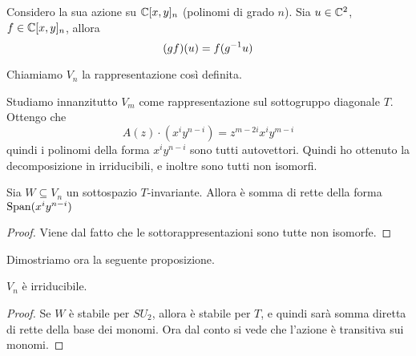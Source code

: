 	Considero la sua azione su $\mathbb C[x,y]_n$ (polinomi di grado $n$). Sia $u \in \mathbb C^2$, $f \in \mathbb C[x,y]_n$, allora 
	\[
	 (gf)(u) = f(g^{-1} u)
	\]
	
	Chiamiamo $V_n$ la rappresentazione così definita.

	Studiamo innanzitutto $V_m$ come rappresentazione sul sottogruppo diagonale $T$.
	Ottengo che 
	\[
		A(z) \cdot (x^i y^{n-i}) = z^{m-2i}x^iy^{m-i}
	\]
	quindi i polinomi della forma $x^iy^{n-i}$ sono tutti autovettori. Quindi ho ottenuto la decomposizione in irriducibili, e inoltre sono tutti non isomorfi.
	
	\begin{mylemma}
	 Sia $W\subseteq V_n$ un sottospazio $T$-invariante. Allora è somma di rette della forma $\operatorname{Span}(x^iy^{n-i})$
	\end{mylemma}
	\begin{proof}
		Viene dal fatto che le sottorappresentazioni sono tutte non isomorfe.
	\end{proof}

	Dimostriamo ora la seguente proposizione.
	\begin{myprop}
	 $V_n$ è irriducibile.
	\end{myprop}
	\begin{proof}
	 Se $W$ è stabile per $SU_2$, allora è stabile per $T$, e quindi sarà somma diretta di rette della base dei monomi. Ora dal conto si vede che l'azione è transitiva sui monomi. 
	\end{proof}


	



